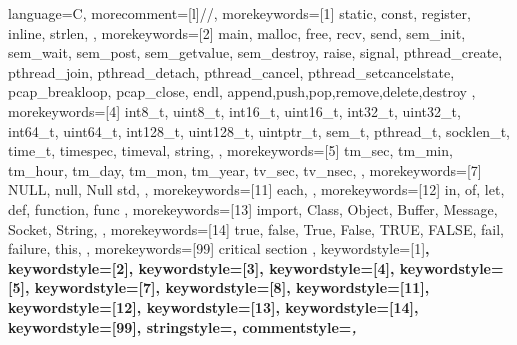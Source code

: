 {%
    language=C,%
    morecomment=[l]{//},%
    morekeywords=[1]{%
        static,
        const,
        register,
        inline,
        strlen,
    },%
    morekeywords=[2]{%
        main,
        malloc,
        free,
        recv,
        send,
        sem_init,
        sem_wait,
        sem_post,
        sem_getvalue,
        sem_destroy,
        raise,
        signal,
        pthread_create,
        pthread_join,
        pthread_detach,
        pthread_cancel,
        pthread_setcancelstate,
        pcap_breakloop,
        pcap_close,
        endl,
        append,push,pop,remove,delete,destroy
    },%
    morekeywords=[4]{%
        int8_t,
        uint8_t,
        int16_t,
        uint16_t,
        int32_t,
        uint32_t,
        int64_t,
        uint64_t,
        int128_t,
        uint128_t,
        uintptr_t,
        sem_t,
        pthread_t,
        socklen_t,
        time_t,
        timespec,
        timeval,
        string,
    },%
    morekeywords=[5]{%
        tm_sec,
        tm_min,
        tm_hour,
        tm_day,
        tm_mon,
        tm_year,
        tv_sec,
        tv_nsec,
    },%
    morekeywords=[7]{%
        NULL, null, Null
        std,
    },%
    morekeywords=[11]{%
        each,
    },%
    morekeywords=[12]{%
        in, of, let, def,
        function, func
    },%
    morekeywords=[13]{%
        import,
        Class, Object,
        Buffer, Message,
        Socket, String,
    },%
    morekeywords=[14]{%
        true, false, True, False, TRUE, FALSE,
        fail, failure,
        this,
    },%
    morekeywords=[99]{%
        critical section
    },%
    keywordstyle=[1]\color{lstCol_C_purple}\bfseries,%
    keywordstyle=[2]\color{lstCol_C_violet}\bfseries,%
    keywordstyle=[3]\color{lstCol_C_purple},%
    keywordstyle=[4]\color{lstCol_C_green},%
    keywordstyle=[5]\color{lstCol_C_blue},%
    keywordstyle=[7]\color{lstCol_C_purple},%
    keywordstyle=[8]\color{lstCol_C_violet},%
    keywordstyle=[11]\color{lstCol_C_foreign1}\bfseries,%
    keywordstyle=[12]\color{lstCol_C_foreign2}\bfseries,%
    keywordstyle=[13]\color{lstCol_C_object},%
    keywordstyle=[14]\color{lstCol_C_moreKey},%
    keywordstyle=[99]\color{red}\bfseries,%
    stringstyle=\color{eclipse_1_string},%
    commentstyle=\color{eclipse_1_comment}\itshape,%
}%
